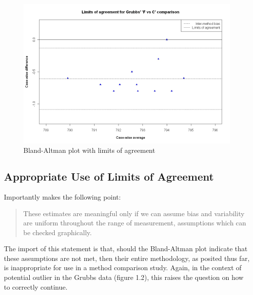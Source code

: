 \documentclass[12pt, a4paper]{report}
\theoremstyle{plain}
\theoremstyle{definition}
\theoremstyle{remark}
\begin{document}
\begin{figure}[h!]
	\begin{center}
		\includegraphics[width=125mm]{images/GrubbsBAplot-LOA.jpeg}
		\caption{Bland-Altman plot with limits of agreement}\label{GrubbsBAplot-noLOA}
	\end{center}
\end{figure}





\subsection{Appropriate Use of Limits of Agreement}
Importantly \citet{BA99} makes the following point:
\begin{quote}These estimates are meaningful only if we can assume
	bias and variability are uniform throughout the range of
	measurement, assumptions which can be checked graphically.
\end{quote}

The import of this statement is that, should the Bland-Altman plot indicate that these assumptions are not met, then their entire methodology, as posited thus far, is inappropriate for use in a method comparison study. Again, in the context of potential outlier in the Grubbs data (figure 1.2), this raises the question on how to correctly continue.
%
\end{document}
